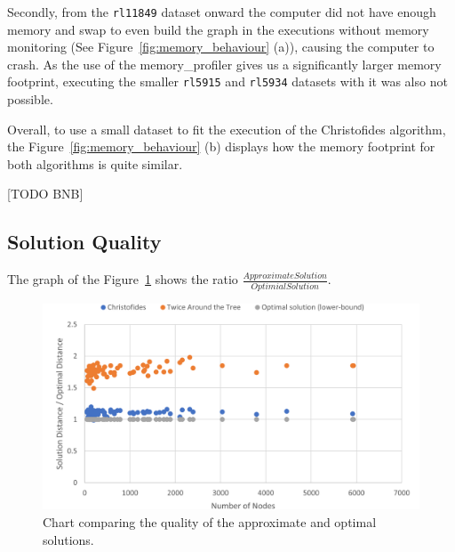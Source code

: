 \documentclass[12pt]{article}
\begin{document}

Secondly, from the \texttt{rl11849} dataset onward the computer did not have enough memory and swap to 
even build the graph in the executions without memory monitoring (See Figure~\ref{fig:memory_behaviour} 
(a)), causing the computer to crash\footnotemark. 
As the use of the memory\_profiler gives us a significantly larger memory footprint, executing the smaller 
\texttt{rl5915} and \texttt{rl5934} datasets with it was also not possible.


Overall, to use a small dataset to fit the execution of the Christofides algorithm, the Figure~\ref{fig:memory_behaviour} (b) 
displays how the memory footprint for both algorithms is quite similar.

[TODO BNB]

\subsection{Solution Quality} \label{sec:exp_quality}

The graph of the Figure~\ref{fig:quality_ratio} shows the ratio $\frac{Approximate Solution}{Optimial Solution}$.

\begin{figure}[ht]
\centering
\includegraphics[height=.325\textheight]{quality_ratio.png}
\caption{Chart comparing the quality of the approximate and optimal solutions.}
\label{fig:quality_ratio}
\end{figure}
\end{document}
